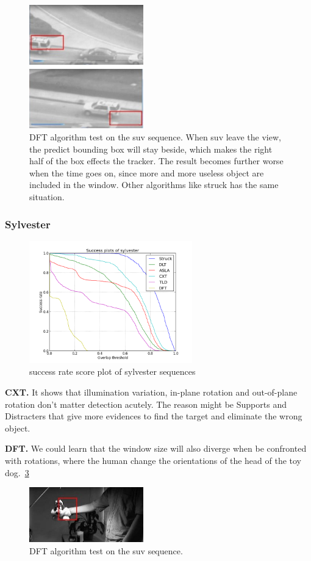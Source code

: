 \documentclass{acm_proc_article-sp}
\begin{document}
\begin{figure}[hbt]
	\centering
    \includegraphics[width=140pt]{dft_suv}
    \caption{DFT algorithm test on the suv sequence. When suv leave the view, the predict bounding box will stay beside, which makes the right half of the box effects the tracker. The result becomes further worse when the time goes on, since more and more useless object are included in the window. Other algorithms like struck has the same situation.}
    \label{fig:dft_suv}
\end{figure}

\subsubsection{Sylvester}

\begin{figure}[hbt]
	\centering
    \includegraphics[width=200pt]{sylvester}
    \caption{success rate score plot of sylvester sequences}
    \label{fig:sylvester}
\end{figure}

\textbf{CXT.} It shows that illumination variation, in-plane rotation and out-of-plane rotation don't matter detection acutely. The reason might be Supports and Distracters that give more evidences to find the target and eliminate the wrong object.

\textbf{DFT.} We could learn that the window size will also diverge when be confronted with rotations, where the human change the orientations of the head of the toy dog.~\ref{fig:dtf_sylvester}
\begin{figure}[hbt]
	\centering
    \includegraphics[width=140pt]{dtf_sylvester}
    \caption{DFT algorithm test on the suv sequence.}
    \label{fig:dtf_sylvester}
\end{figure}
\end{document}
